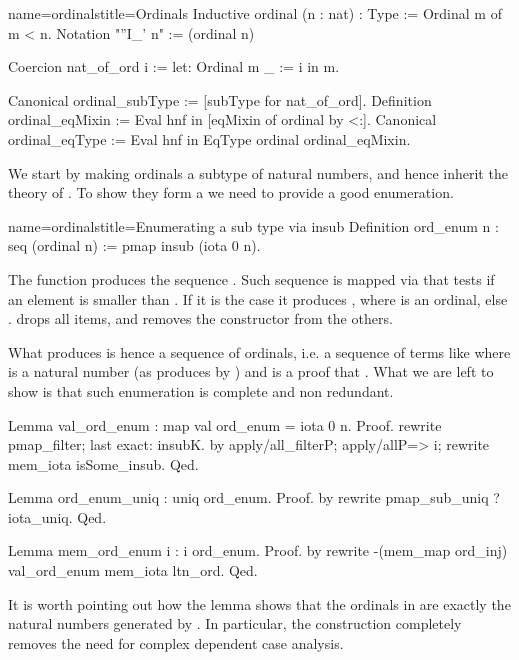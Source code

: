 \begin{coq}{name=ordinals}{title=Ordinals}
Inductive ordinal (n : nat) : Type := Ordinal m of m < n.
Notation "''I_' n" := (ordinal n)

Coercion nat_of_ord i := let: Ordinal m _ := i in m.

Canonical ordinal_subType := [subType for nat_of_ord].
Definition ordinal_eqMixin := Eval hnf in [eqMixin of ordinal by <:].
Canonical ordinal_eqType := Eval hnf in EqType ordinal ordinal_eqMixin.
\end{coq}

We start by making ordinals a subtype of natural numbers, and hence
inherit the theory of .  To show they form a 
we need to provide a good enumeration.

\begin{coq}{name=ordinals}{title=Enumerating a sub type via insub}
Definition ord_enum n : seq (ordinal n) := pmap insub (iota 0 n).
\end{coq}

The  function produces the sequence \C{[:: 0, 1, ... n.-1]}.
Such sequence is mapped via  that tests if an element 
is smaller than .  If it is the case it produces ,
where  is an ordinal, else .   drops all 
items, and removes the  constructor from the others.

What  produces is hence a sequence of ordinals, i.e.
a sequence of terms like  where  is a natural
number (as produces by ) and  is a proof that .  What we are left to show is that such enumeration is complete
and non redundant.

\begin{coq}{}{}
Lemma val_ord_enum : map val ord_enum = iota 0 n.
Proof.
rewrite pmap_filter; last exact: insubK.
by apply/all_filterP; apply/allP=> i; rewrite mem_iota isSome_insub.
Qed.

Lemma ord_enum_uniq : uniq ord_enum.
Proof. by rewrite pmap_sub_uniq ?iota_uniq. Qed.

Lemma mem_ord_enum i : i \in ord_enum.
Proof. by rewrite -(mem_map ord_inj) val_ord_enum mem_iota ltn_ord. Qed.
\end{coq}

It is worth pointing out how the  lemma
shows that the ordinals in  are exactly the
natural numbers generated by .  In particular,
the  construction completely removes the need for
complex dependent case analysis.

